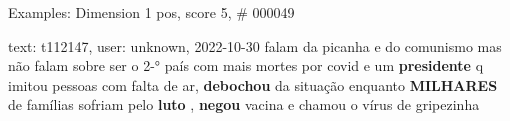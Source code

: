 \begin{frame}{Examples: Dimension 1 pos, score 5, \# 000049}
\footnotesize
\begin{exampleblock}{text: t112147, user: unknown, 2022-10-30}
falam da picanha e do comunismo mas não falam sobre ser o 2-° país com mais 
mortes por covid e um \textbf{presidente} q imitou pessoas com falta de ar, 
\textbf{debochou} da situação enquanto \textbf{MILHARES} de famílias sofriam 
pelo \textbf{luto} , \textbf{negou} vacina e chamou o vírus de gripezinha 
\end{exampleblock}
\end{frame}
